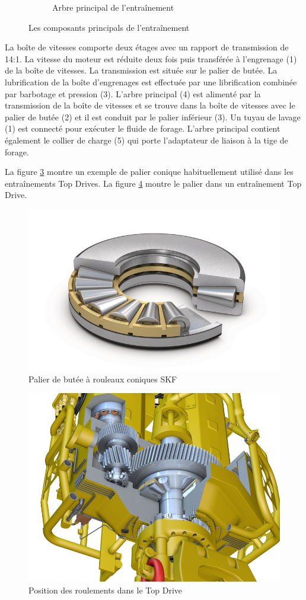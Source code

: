 \begin{figure}[H]
\begin{subfigure}[t]{0.4\textwidth}
	 \label{fig:topdrive-drillingunit-drive-mainshaft}
	 \caption{Arbre principal de l'entraînement}
     \end{subfigure}
	\caption{Les composants principals de l'entraînement}%
	\label{fig:topdrive-drillingunit-drive-components}
\end{figure}

La boîte de vitesses comporte deux étages avec un rapport de transmission de 14:1. La vitesse du moteur est réduite deux fois puis transférée à l'engrenage (1) de la boîte de vitesses. La transmission est située sur le palier de butée. La lubrification de la boîte d'engrenages est effectuée par une librification combinée par barbotage et pression (3). L'arbre principal (4) est alimenté par la transmission de la boîte de vitesses et se trouve dans la boîte de vitesses avec le palier de butée (2) et il est conduit par le palier inférieur (3). Un tuyau de lavage (1) est connecté pour exécuter le fluide de forage. L'arbre principal contient également le collier de charge (5) qui porte l'adaptateur de liaison à la tige de forage. 

La figure \ref{fig:skf_tapered_roller_thrust_bearing} montre un exemple de palier conique habituellement utilisé dans les entraînements Top Drives. La figure \ref{fig:skf_topdrive} montre le palier dans un entraînement Top Drive.

\begin{figure}[H]
	\centering
	\includegraphics[width=0.6\linewidth]{figures/skf_tapered_roller_thrust_bearing.png}
	\caption{Palier de butée à rouleaux coniques SKF \cite{skf_tapered_roller_thurst_bearing}}%
	\label{fig:skf_tapered_roller_thrust_bearing}
\end{figure}

\begin{figure}[H]
	\centering
	\includegraphics[width=0.7\linewidth]{figures/skf_topdrive.png}
	\caption{Position des roulements dans le Top Drive \cite{skf_bearing}}%
	\label{fig:skf_topdrive}
\end{figure}


